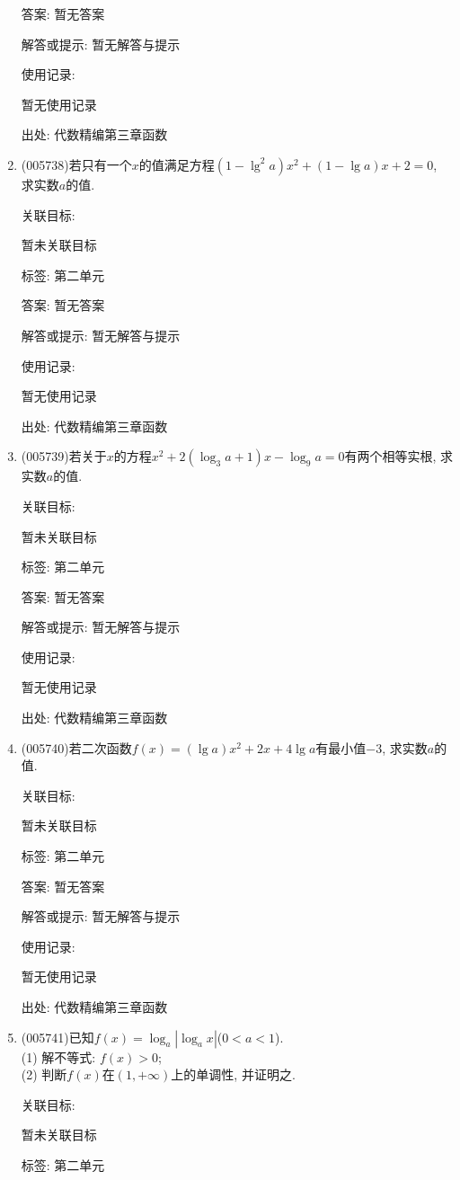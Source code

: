 \documentclass[10pt,a4paper]{article}
\begin{document}
\begin{enumerate}[1.]
答案: 暂无答案

解答或提示: 暂无解答与提示

使用记录:

暂无使用记录


出处: 代数精编第三章函数
\item { (005738)}若只有一个$x$的值满足方程$(1-\lg ^2a)x^2+(1-\lg a)x+2=0$, 求实数$a$的值.


关联目标:

暂未关联目标



标签: 第二单元

答案: 暂无答案

解答或提示: 暂无解答与提示

使用记录:

暂无使用记录


出处: 代数精编第三章函数
\item { (005739)}若关于$x$的方程$x^2+2(\log_3a+1)x-\log_9a=0$有两个相等实根, 求实数$a$的值.


关联目标:

暂未关联目标



标签: 第二单元

答案: 暂无答案

解答或提示: 暂无解答与提示

使用记录:

暂无使用记录


出处: 代数精编第三章函数
\item { (005740)}若二次函数$f(x)=(\lg a)x^2+2x+4\lg a$有最小值$-3$, 求实数$a$的值.


关联目标:

暂未关联目标



标签: 第二单元

答案: 暂无答案

解答或提示: 暂无解答与提示

使用记录:

暂无使用记录


出处: 代数精编第三章函数
\item { (005741)}已知$f(x)=\log_a|\log_ax|$($0<a<1$).\\
(1) 解不等式: $f(x)>0$;\\
(2) 判断$f(x)$在$(1,+\infty)$上的单调性, 并证明之.


关联目标:

暂未关联目标



标签: 第二单元


\end{enumerate}
\end{document}
